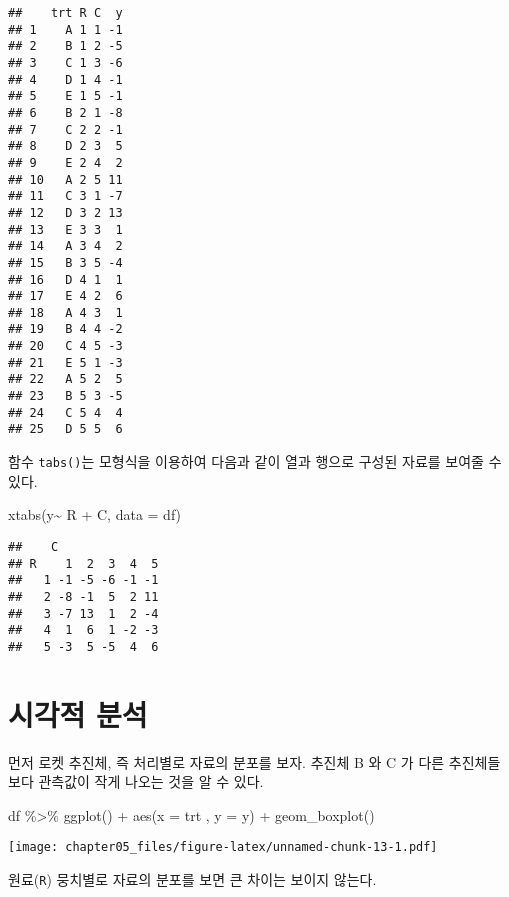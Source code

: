\documentclass[
]{book}
\newenvironment{Shaded}{\begin{snugshade}}{\end{snugshade}}
\newcommand{\AttributeTok}[1]{\textcolor[rgb]{0.77,0.63,0.00}{#1}}
\newcommand{\FunctionTok}[1]{\textcolor[rgb]{0.00,0.00,0.00}{#1}}
\newcommand{\NormalTok}[1]{#1}
\newcommand{\SpecialCharTok}[1]{\textcolor[rgb]{0.00,0.00,0.00}{#1}}
\begin{document}
\begin{verbatim}
##    trt R C  y
## 1    A 1 1 -1
## 2    B 1 2 -5
## 3    C 1 3 -6
## 4    D 1 4 -1
## 5    E 1 5 -1
## 6    B 2 1 -8
## 7    C 2 2 -1
## 8    D 2 3  5
## 9    E 2 4  2
## 10   A 2 5 11
## 11   C 3 1 -7
## 12   D 3 2 13
## 13   E 3 3  1
## 14   A 3 4  2
## 15   B 3 5 -4
## 16   D 4 1  1
## 17   E 4 2  6
## 18   A 4 3  1
## 19   B 4 4 -2
## 20   C 4 5 -3
## 21   E 5 1 -3
## 22   A 5 2  5
## 23   B 5 3 -5
## 24   C 5 4  4
## 25   D 5 5  6
\end{verbatim}

함수 \texttt{tabs()}는 모형식을 이용하여 다음과 같이 열과 행으로 구성된 자료를 보여줄 수 있다.

\begin{Shaded}
\begin{Highlighting}[]
\FunctionTok{xtabs}\NormalTok{(y}\SpecialCharTok{\textasciitilde{}}\NormalTok{ R }\SpecialCharTok{+}\NormalTok{ C, }\AttributeTok{data =}\NormalTok{ df)}
\end{Highlighting}
\end{Shaded}

\begin{verbatim}
##    C
## R    1  2  3  4  5
##   1 -1 -5 -6 -1 -1
##   2 -8 -1  5  2 11
##   3 -7 13  1  2 -4
##   4  1  6  1 -2 -3
##   5 -3  5 -5  4  6
\end{verbatim}

\hypertarget{uxc2dcuxac01uxc801-uxbd84uxc11d-1}{%
\section{시각적 분석}\label{uxc2dcuxac01uxc801-uxbd84uxc11d-1}}

먼저 로켓 추진체, 즉 처리별로 자료의 분포를 보자. 추진체 B 와 C 가 다른 추진체들 보다 관측값이 작게 나오는 것을 알 수 있다.

\begin{Shaded}
\begin{Highlighting}[]
\NormalTok{df }\SpecialCharTok{\%\textgreater{}\%} 
  \FunctionTok{ggplot}\NormalTok{() }\SpecialCharTok{+}
  \FunctionTok{aes}\NormalTok{(}\AttributeTok{x =}\NormalTok{ trt , }\AttributeTok{y =}\NormalTok{ y) }\SpecialCharTok{+}
  \FunctionTok{geom\_boxplot}\NormalTok{() }
\end{Highlighting}
\end{Shaded}

\texttt{[image: chapter05\_files/figure-latex/unnamed-chunk-13-1.pdf]}

원료(\texttt{R}) 뭉치별로 자료의 분포를 보면 큰 차이는 보이지 않는다.
\end{document}
